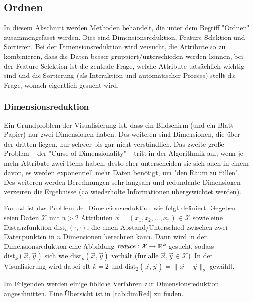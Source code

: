 		\subsection{Ordnen}
			In diesem Abschnitt werden Methoden behandelt, die unter dem Begriff "Ordnen" zusammengefasst werden. Dies sind \bspw Dimensionsreduktion, Feature-Selektion und Sortieren. Bei der Dimensionsreduktion wird versucht, die Attribute so zu kombinieren, dass die Daten besser gruppiert/unterschieden werden können, bei der Feature-Selektion ist die zentrale Frage, welche Attribute tatsächlich wichtig sind und die Sortierung (als Interaktion und automatischer Prozess) stellt die Frage, wonach eigentlich gesucht wird.

			\subsubsection{Dimensionsreduktion}
				\label{subsubsec:dimred}

				Ein Grundproblem der Visualisierung ist, dass ein Bildschirm (und ein Blatt Papier) nur zwei Dimensionen haben. Des weiteren sind Dimensionen, die über der dritten liegen, nur schwer bis gar nicht verständlich. Das zweite große Problem -- der "Curse of Dimensionality" -- tritt in der Algorithmik auf, wenn je mehr Attribute zwei Items haben, desto eher unterscheiden sie sich auch in einem davon, \dh es werden exponentiell mehr Daten benötigt, um "den Raum zu füllen". Des weiteren werden Berechnungen sehr langsam und redundante Dimensionen verzerren die Ergebnisse (da wiederholte Informationen übergewichtet werden).

				Formal ist das Problem der Dimensionsreduktion wie folgt definiert: Gegeben seien Daten \( \mathcal{X} \) mit \(n > 2\) Attributen \( \vec{x} = (x_1, x_2, \dots, x_n) \in \mathcal{X} \) sowie eine Distanzfunktion \( \mathrm{dist}_n(\cdot, \cdot) \), die einen Abstand/Unterschied zwischen zwei Datenpunkten in \(n\) Dimensionen berechnen kann. Dann wird in der Dimensionsreduktion eine Abbildung \( \mathit{reduce} : \mathcal{X} \to \mathbb{R}^k \) gesucht, sodass \( \mathrm{dist}_k(\vec{x}, \vec{y}) \) sich wie \( \mathrm{dist}_n(\vec{x}, \vec{y}) \) verhält (für alle \( \vec{x}, \vec{y} \in \mathcal{X} \)). In der Visualisierung wird dabei oft \( k = 2 \) und \( \mathrm{dist}_2(\vec{x}, \vec{y}) = \lVert \vec{x} - \vec{y} \rVert_2 \) gewählt.

				Im Folgenden werden einige übliche Verfahren zur Dimensionsreduktion angeschnitten. Eine Übersicht ist in \autoref{tab:dimRed} zu finden.

